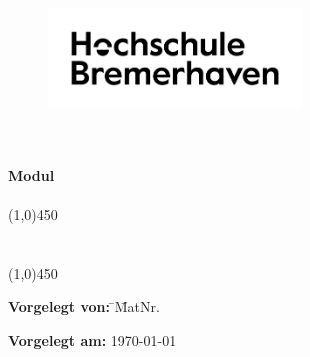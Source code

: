 \setmainfont{TeX Gyre Adventor}
\thispagestyle{empty}
\begin{figure}[h!]
	\centering
	\includegraphics[width=0.6\textwidth]{src/abbildungen/logoneu.png}
\end{figure}
\begin{center}
	\large{\textbf{\department}}\\
	\large{\textbf{\studyprogram}}\\
	\vspace{1cm}
	{
		\large{\textbf{Modul\\ \modulname}}\\
	}
	\vspace*{\fill}
	\line(1,0){450}\\
	\doublespacing
	\textbf{\Large{\thetitle}}\\
	\textbf{\large{\thesubtitle}}\\
	\line(1,0){450}\\
\end{center}
\vspace*{\fill}
\onehalfspacing
\small{
\begin{flushleft}
	\begin{tabbing}
		\textbf{Vorgelegt von:} \hspace*{0.8cm}\= \theauthor \hspace*{\myspace}\= MatNr. \matriculationnumber \\

		\secondauthor
		\thirdauthor

		\textbf{Vorgelegt am:} \> \today\\
		{
			\auditor\\
		}
	\end{tabbing}
\end{flushleft}}
\setmainfont{TeX Gyre Termes}